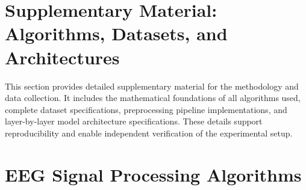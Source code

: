 
\label{app:ch3_support_appx}

\section{Supplementary Material: Algorithms, Datasets, and Architectures}

This section provides detailed supplementary material for the methodology and data collection. It includes the mathematical foundations of all algorithms used, complete dataset specifications, preprocessing pipeline implementations, and layer-by-layer model architecture specifications. These details support reproducibility and enable independent verification of the experimental setup.


\label{app:algorithms}

\section{EEG Signal Processing Algorithms}

